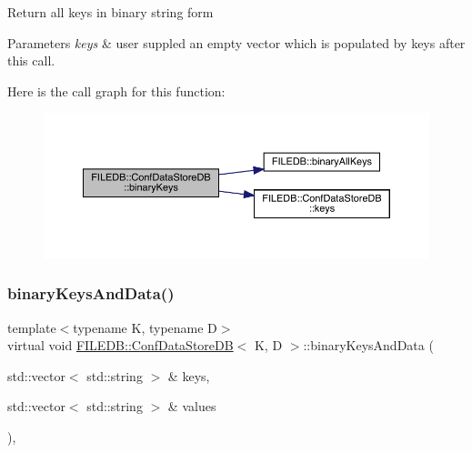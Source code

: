Return all keys in binary string form 
\begin{DoxyParams}{Parameters}
{\em keys} & user suppled an empty vector which is populated by keys after this call. \\
\hline
\end{DoxyParams}
Here is the call graph for this function\+:
\nopagebreak
\begin{figure}[H]
\begin{center}
\leavevmode
\includegraphics[width=350pt]{d8/d19/classFILEDB_1_1ConfDataStoreDB_a1d0e8e27cd8fc6b24ece52259d1ab2b0_cgraph}
\end{center}
\end{figure}
\mbox{\label{classFILEDB_1_1ConfDataStoreDB_ae38beaf9ba3f8629f2c322a3c5a23357}} 
\subsubsection{\texorpdfstring{binaryKeysAndData()}{binaryKeysAndData()}\hspace{0.1cm}{\footnotesize\ttfamily [1/3]}}
{\footnotesize\ttfamily template$<$typename K, typename D$>$ \\
virtual void \mbox{\hyperlink{classFILEDB_1_1ConfDataStoreDB}{F\+I\+L\+E\+D\+B\+::\+Conf\+Data\+Store\+DB}}$<$ K, D $>$\+::binary\+Keys\+And\+Data (\begin{DoxyParamCaption}\item[{std\+::vector$<$ std\+::string $>$ \&}]{keys,  }\item[{std\+::vector$<$ std\+::string $>$ \&}]{values }\end{DoxyParamCaption})\hspace{0.3cm}{\ttfamily [inline]}, {\ttfamily [virtual]}}

